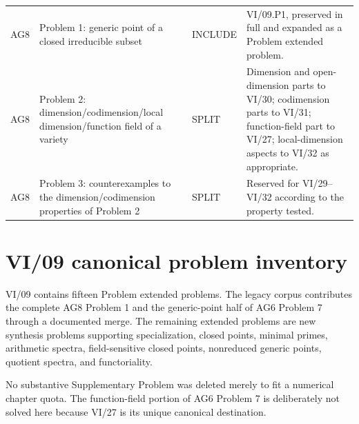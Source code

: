 \begin{longtable}{p{}p{}p{}p{}}
\midrule
AG8 & Problem 1: generic point of a closed irreducible subset & INCLUDE & VI/09.P1, preserved in full and expanded as a Problem extended problem.\\
AG8 & Problem 2: dimension/codimension/local dimension/function field of a variety & SPLIT & Dimension and open-dimension parts to VI/30; codimension parts to VI/31; function-field part to VI/27; local-dimension aspects to VI/32 as appropriate.\\
AG8 & Problem 3: counterexamples to the dimension/codimension properties of Problem 2 & SPLIT & Reserved for VI/29--VI/32 according to the property tested.\\
\bottomrule
\end{longtable}

\section*{VI/09 canonical problem inventory}

VI/09 contains fifteen Problem extended problems.  The legacy corpus contributes the complete AG8
Problem 1 and the generic-point half of AG6 Problem 7 through a documented merge.  The
remaining extended problems are new synthesis problems supporting specialization, closed points,
minimal primes, arithmetic spectra, field-sensitive closed points, nonreduced generic
points, quotient spectra, and functoriality.

No substantive Supplementary Problem was deleted merely to fit a numerical chapter quota.
The function-field portion of AG6 Problem 7 is deliberately not solved here because VI/27
is its unique canonical destination.
